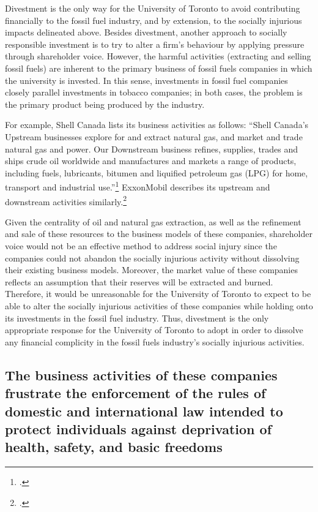 Divestment is the only way for the University of Toronto to avoid contributing financially to the fossil fuel industry, and by extension, to the socially injurious impacts delineated above.
Besides divestment, another approach to socially responsible investment is to try to alter a firm’s behaviour by applying pressure through shareholder voice. 
However, the harmful activities (extracting and selling fossil fuels) are inherent to the primary business of fossil fuels companies in which the university is invested.  
In this sense, investments in fossil fuel companies closely parallel investments in tobacco companies; in both cases, the problem is the primary product being produced by the industry.



For example, Shell Canada lists its business activities as follows: ``Shell Canada's Upstream businesses explore for and extract natural gas, and market and trade natural gas and power. Our Downstream business refines, supplies, trades and ships crude oil worldwide and manufactures and markets a range of products, including fuels, lubricants, bitumen and liquified petroleum gas (LPG) for home, transport and industrial use.''\footcite[][]{ShellAtAGlance}
ExxonMobil describes its upstream and downstream activities similarly.\footcite[][]{ExxonWhatWeDo}



Given the centrality of oil and natural gas extraction, as well as the refinement and sale of these resources to the business models of these companies, shareholder voice would not be an effective method to address social injury since the companies could not abandon the socially injurious activity without dissolving their existing business models.  
Moreover, the market value of these companies reflects an assumption that their reserves will be extracted and burned.  
Therefore, it would be unreasonable for the University of Toronto to expect to be able to alter the socially injurious activities of these companies while holding onto its investments in the fossil fuel industry.  
Thus, divestment is the only appropriate response for the University of Toronto to adopt in order to dissolve any financial complicity in the fossil fuels industry’s socially injurious activities.  



	\subsection{The business activities of these companies frustrate the enforcement of the rules of domestic and international law intended to protect individuals against deprivation of health, safety, and basic freedoms}
	\label{sec:FrustrateLaw}


